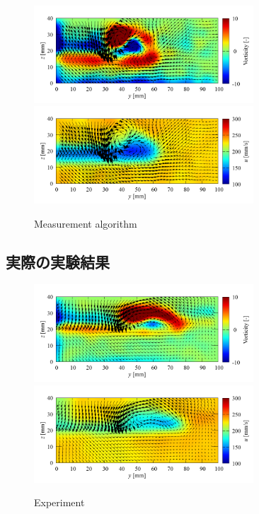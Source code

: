 \documentclass[twocolumn,a4j]{jsarticle}
\begin{document}
\begin{figure}[htbp]
  \centering
  {
    \includegraphics[keepaspectratio, width=82mm]{../images/Analysis_Result/velocity_and_vorticity.png}
    \includegraphics[keepaspectratio, width=82mm]{../images/Analysis_Result/velocity_xyz.png}
  }
  \caption{Measurement algorithm}
\end{figure}

\subsection{実際の実験結果}
\begin{figure}[htbp]
  \centering
  {
    \includegraphics[keepaspectratio, width=82mm]{../images/Experiment/velocity_and_vorticity.png}
    \includegraphics[keepaspectratio, width=82mm]{../images/Experiment/velocity_xyz.png}
  }
  \caption{Experiment}
\end{figure}
\end{document}

